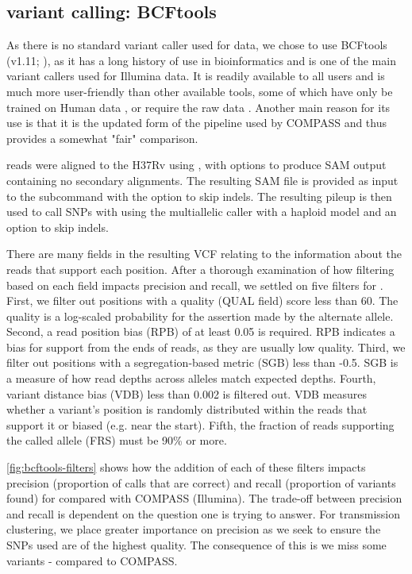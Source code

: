 \subsection{\ont{} variant calling: BCFtools}
\label{sec:bcftools-filters}

As there is no standard variant caller used for \mtb{} \ont{} data, we chose to use BCFtools (v1.11; \cite{bcftools2021}), as it has a long history of use in bioinformatics and is one of the main variant callers used for Illumina data. It is readily available to all users and is much more user-friendly than other available tools, some of which have only be trained on Human data \cite{clair2020}, or require the raw \ont{} data \cite{nanopolish2015}. Another main reason for its use is that it is the updated form of the  pipeline used by COMPASS and thus provides a somewhat "fair" comparison.

\ont{} reads were aligned to the H37Rv using , with options to produce SAM output containing no secondary alignments. The resulting SAM file is provided as input to the \bcftools{} subcommand  with the option to skip indels. The resulting pileup is then used to call SNPs with  using the multiallelic caller with a haploid model and an option to skip indels.

There are many fields in the resulting VCF relating to the information about the reads that support each position. After a thorough examination of how filtering based on each field impacts precision and recall, we settled on five filters for \bcftools{}. First, we filter out positions with a quality (QUAL field) score less than 60. The quality is a log-scaled probability for the assertion made by the alternate allele. Second, a read position bias (RPB) of at least 0.05 is required. RPB indicates a bias for support from the ends of reads, as they are usually low quality. Third, we filter out positions with a segregation-based metric (SGB) less than -0.5. SGB is a measure of how read depths across alleles match expected depths. Fourth, variant distance bias (VDB) less than 0.002 is filtered out. VDB measures whether a variant's position is randomly distributed within the reads that support it or biased (e.g. near the start). Fifth, the fraction of reads supporting the called allele (FRS) must be 90\% or more.

\autoref{fig:bcftools-filters} shows how the addition of each of these filters impacts precision (proportion of calls that are correct) and recall (proportion of variants found) for \bcftools{} compared with COMPASS (Illumina). The trade-off between precision and recall is dependent on the question one is trying to answer. For transmission clustering, we place greater importance on precision as we seek to ensure the SNPs used are of the highest quality. The consequence of this is we miss some variants - compared to COMPASS.

